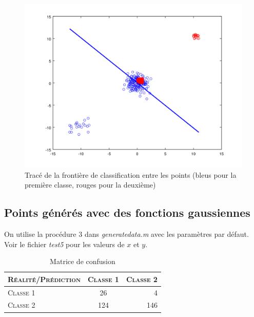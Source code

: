 \documentclass{article}
\begin{document}
         \begin{figure}
           \begin{center}
             \subfigure\includegraphics[scale=0.3]{images/line2D4.png}
             \caption{Tracé de la frontière de classification entre les points (bleus pour la première classe, rouges pour la deuxième)}
           \end{center}
         \end{figure}

\subsection{Points générés avec des fonctions gaussiennes}

On utilise la procédure 3 dans \emph{generatedata.m} avec les paramètres par défaut. Voir le fichier \emph{test5} pour les valeurs de $x$ et $y$.

     \begin{table}[H]
       \caption{Matrice de confusion}
       \begin{tabular}{|l|c|r|}
         \hline
         \textsc{Réalité/Prédiction} & \textsc{Classe 1} & \textsc{Classe 2}\\
         \hline
         \textsc{Classe 1} & 26 & 4\\
         \hline
         \textsc{Classe 2} & 124 & 146\\
         \hline
       \end{tabular}
     \end{table}
\end{document}
